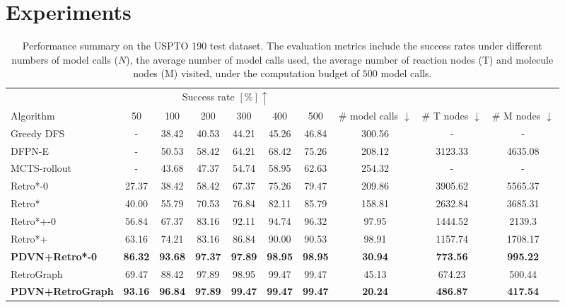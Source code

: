 \documentclass[nohyperref]{article}
\theoremstyle{plain}
\theoremstyle{definition}
\theoremstyle{remark}
\begin{document}
\section{Experiments}



\begin{table*}[t]
    \caption{Performance summary on the USPTO 190 test dataset. The evaluation metrics include the success rates under different numbers of model calls ($N$), the average number of model calls used, the average number of reaction nodes (T) and molecule nodes (M) visited, under the computation budget of $500$ model calls.}
    \label{tab:main_results}
    \centering
    \resizebox{\textwidth}{!} {\begin{tabular}{l cccccc ccc}
        \toprule
         & \multicolumn{6}{c}{Success rate $[\%] \uparrow$} & \\
        \cmidrule(lr){2-7} 
        Algorithm & 50  & 100 & 200 & 300 & 400 & 500 & \# model calls $\downarrow$ & \# T nodes $\downarrow$ & \# M nodes $\downarrow$ \\
        \midrule
        Greedy DFS & - & 38.42 & 40.53 & 44.21 & 45.26 & 46.84 & 300.56 & - & - \\
        DFPN-E & - & 50.53 & 58.42 & 64.21 & 68.42 & 75.26 & 208.12 & 3123.33 & 4635.08 \\
        MCTS-rollout & - & 43.68 & 47.37 & 54.74 & 58.95 & 62.63 & 254.32 & - & - \\
        \midrule
        Retro*-0 & 27.37 & 38.42 & 58.42 & 67.37 & 75.26 & 79.47 & 209.86 & 3905.62 & 5565.37 \\
        Retro* & 40.00 & 55.79 & 70.53 & 76.84 & 82.11 & 85.79 & 158.81 & 2632.84 & 3685.31 \\
        Retro*+-0 & 56.84 & 67.37 & 83.16 & 92.11 & 94.74 & 96.32 & 97.95 & 1444.52 & 2139.3 \\
        Retro*+ & 63.16 & 74.21 & 83.16 & 86.84 & 90.00 & 90.53 & 98.91 & 1157.74 & 1708.17 \\
\textbf{PDVN+Retro*-0} & \textbf{86.32} & \textbf{93.68} & \textbf{97.37} & \textbf{97.89} & \textbf{98.95} & \textbf{98.95} & \textbf{30.94} & \textbf{773.56} &  \textbf{995.22} \\
        \midrule
        RetroGraph & 69.47 & 88.42 & 97.89 & 98.95 & 99.47 & 99.47 & 45.13 & 674.23 & 500.44 \\
\textbf{PDVN+RetroGraph} & \textbf{93.16} & \textbf{96.84} & \textbf{97.89} & \textbf{99.47} & \textbf{99.47} & \textbf{99.47} & \textbf{20.24} & \textbf{486.87} & \textbf{417.54} \\
        
\bottomrule
    \end{tabular}}
\end{table*}
\end{document}
